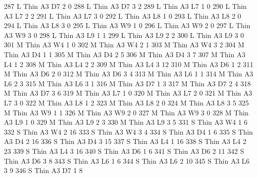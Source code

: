 \documentclass{article}
\begin{document}
\begin{Schunk}
\begin{Soutput}
287       L   Thin   A3      D7     2     0
288       L   Thin   A3      D7     3     2
289       L   Thin   A3      L7     1     0
290       L   Thin   A3      L7     2     2
291       L   Thin   A3      L7     3     0
292       L   Thin   A3      L8     1     0
293       L   Thin   A3      L8     2     0
294       L   Thin   A3      L8     3     0
295       L   Thin   A3      W9     1     0
296       L   Thin   A3      W9     2     0
297       L   Thin   A3      W9     3     0
298       L   Thin   A3      L9     1     1
299       L   Thin   A3      L9     2     2
300       L   Thin   A3      L9     3     0
301       M   Thin   A3      W4     1     0
302       M   Thin   A3      W4     2     1
303       M   Thin   A3      W4     3     2
304       M   Thin   A3      D4     1     1
305       M   Thin   A3      D4     2     5
306       M   Thin   A3      D4     3     7
307       M   Thin   A3      L4     1     2
308       M   Thin   A3      L4     2     2
309       M   Thin   A3      L4     3    12
310       M   Thin   A3      D6     1     2
311       M   Thin   A3      D6     2     0
312       M   Thin   A3      D6     3     4
313       M   Thin   A3      L6     1     1
314       M   Thin   A3      L6     2     3
315       M   Thin   A3      L6     3     1
316       M   Thin   A3      D7     1     3
317       M   Thin   A3      D7     2     4
318       M   Thin   A3      D7     3     6
319       M   Thin   A3      L7     1     0
320       M   Thin   A3      L7     2     0
321       M   Thin   A3      L7     3     0
322       M   Thin   A3      L8     1     2
323       M   Thin   A3      L8     2     0
324       M   Thin   A3      L8     3     5
325       M   Thin   A3      W9     1     1
326       M   Thin   A3      W9     2     0
327       M   Thin   A3      W9     3     0
328       M   Thin   A3      L9     1     0
329       M   Thin   A3      L9     2     3
330       M   Thin   A3      L9     3     5
331       S   Thin   A3      W4     1     6
332       S   Thin   A3      W4     2    16
333       S   Thin   A3      W4     3     4
334       S   Thin   A3      D4     1     6
335       S   Thin   A3      D4     2    16
336       S   Thin   A3      D4     3    15
337       S   Thin   A3      L4     1    16
338       S   Thin   A3      L4     2    23
339       S   Thin   A3      L4     3    16
340       S   Thin   A3      D6     1     6
341       S   Thin   A3      D6     2    11
342       S   Thin   A3      D6     3     8
343       S   Thin   A3      L6     1     6
344       S   Thin   A3      L6     2    10
345       S   Thin   A3      L6     3     9
346       S   Thin   A3      D7     1     8

\end{Soutput}
\end{Schunk}
\end{document}
